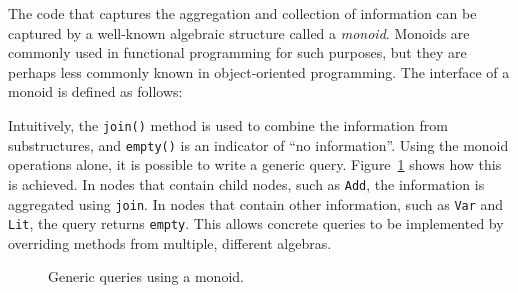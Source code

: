 
The code that captures the aggregation and collection of information
can be captured by a well-known algebraic structure called a
\emph{monoid}. Monoids are commonly used in functional programming
for such purposes, but they are perhaps less commonly known in
object-oriented programming.  The interface of a monoid is defined as follows:
\begin{quote}
\end{quote}
Intuitively, the \lstinline{join()} method is
used to combine the information from substructures, and
\lstinline{empty()} is an indicator of ``no information''.
Using the monoid operations alone, it is possible to write a generic
query. Figure~\ref{generic_query} shows how this is achieved. In
nodes that contain child nodes, such as \lstinline{Add}, the
information is aggregated using \lstinline{join}. In nodes that
contain other information, such as \lstinline{Var} and
\lstinline{Lit}, the query returns \lstinline{empty}.
This allows concrete queries to be implemented by overriding methods from multiple, different algebras.

\begin{figure}[tb]
\nocaptionrule
\caption{Generic queries using a monoid.}
\label{generic_query}
\end{figure}

\begin{comment}
And now we find everything goes in an easier way: we don't care about
what kind of query it is any more during the traversal. Despite
whether it asks for all the names of free variables or a printer
showing the hierarchy of an expression, at first we can simply
override the method \lstinline{m()}, which provides an instance of
\lstinline{Monoid}, in the return statement. As the next step, we only
need to override a few other methods to meet the requirements. This is
the progress, once we have such a template dealing with the traversal,
all query algebras can be addressed in a more concise way, which is
called the \textit{generic query algebra}.
\end{comment}

